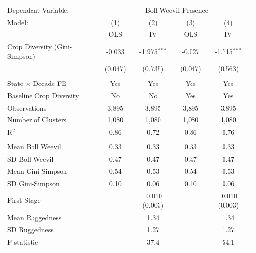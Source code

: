\begingroup
\centering
\begin{tabular}{lcccc}
   \toprule \toprule
   Dependent Variable: & \multicolumn{4}{c}{Boll Weevil Presence} \\
   Model: & (1) & (2) & (3) & (4) \\
          & OLS  & IV & OLS & IV \\
   \midrule
  Crop Diversity (Gini-Simpson) & -0.033 & -1.975$^{***}$ & -0.027 & -1.715$^{***}$ \\
  & (0.047) & (0.735) & (0.047) & (0.563) \\
   & & & & \\
   State $\times$ Decade FE        & Yes & Yes & Yes & Yes \\
   Baseline Crop Diversity         & No   & No & Yes & Yes \\
   \midrule
  Observations & 3,895 & 3,895 & 3,895 & 3,895 \\
  Number of Clusters & 1,080 & 1,080 & 1,080 & 1,080 \\
  R$^2$ & 0.86 & 0.72 & 0.86 & 0.76 \\
   & & & & \\

  Mean Boll Weevil & 0.33 & 0.33 & 0.33 & 0.33 \\
  SD Boll Weevil & 0.47 & 0.47 & 0.47 & 0.47 \\
  Mean Gini-Simpson & 0.54 & 0.53 & 0.54 & 0.53 \\
  SD Gini-Simpson & 0.10 & 0.06 & 0.10 & 0.06 \\
   
   \midrule
  First Stage &  & -0.010 (0.003) &  & -0.010 (0.003) \\
  Mean Ruggedness &  & 1.34 &  & 1.34 \\
  SD Ruggedness &  & 1.27 &  & 1.27 \\
  F-statistic &  & 37.4 &  & 54.1 \\
   \bottomrule \bottomrule
\end{tabular}
\par\endgroup
